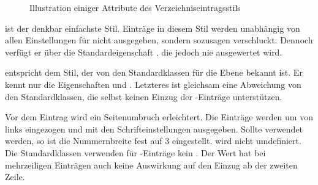 \begin{description}
\begin{figure}
{%
    }
    \caption{Illustration einiger Attribute des Verzeichniseintragsstils
      }
  \end{figure}
\item[\PValue{gobble}] ist der denkbar einfachste Stil. Einträge in diesem
  Stil werden unabhängig von allen Einstellungen für
  nicht ausgegeben, sondern sozusagen verschluckt. Dennoch verfügt er über die
  Standardeigenschaft , die jedoch nie ausgewertet wird.
\item[\PValue{largetocline}] entspricht dem Stil, der von den Standardklassen
  für die Ebene  bekannt ist. Er kennt
  nur die Eigenschaften
   und . Letzteres ist gleichsam eine Abweichung
  von den Standardklassen, die selbst keinen Einzug der -Einträge
  unterstützen.

  Vor dem Eintrag wird ein Seitenumbruch erleichtert. Die Einträge werden um
   von links eingezogen und mit den Schrifteinstellungen
   ausgegeben. Sollte
   verwendet werden, so ist die
  Nummernbreite fest auf 3
  eingestellt.  wird nicht umdefiniert. Die
  Standardklassen verwenden für -Einträge kein
  . Der Wert hat bei mehrzeiligen Einträgen
  auch keine Auswirkung auf den Einzug ab der zweiten Zeile.


\end{description}
